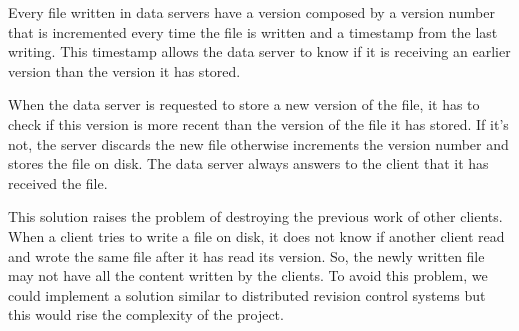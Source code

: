 Every file written in data servers have a version composed by a version
number that is incremented every time the file is written and a timestamp
from the last writing. This timestamp allows the data server to know if it is
receiving an earlier version than the version it has stored.

When the data server is requested to store a new version of the file, it has 
to check if this version is more recent than the version of the file it has 
stored. If it's not, the server discards the new file otherwise increments 
the version number and stores the file on disk. The data server always answers
to the client that it has received the file.

This solution raises the problem of destroying the previous work of other 
clients. When a client tries to write a file on disk, it does not know if 
another client read and wrote the same file after it has read its version. 
So, the newly written file may not have all the content written by the 
clients. To avoid this problem, we could implement a solution similar to 
distributed revision control systems but this would rise the complexity 
of the project.